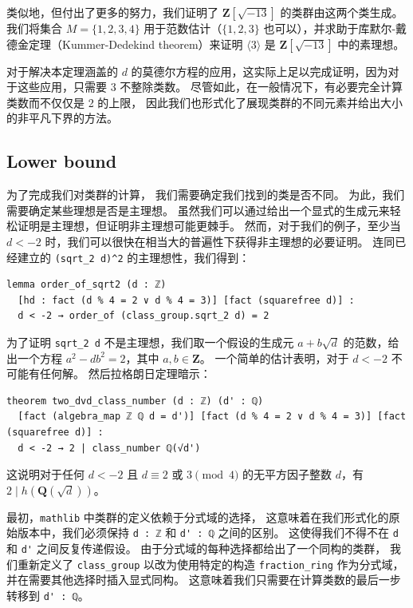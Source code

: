 \documentclass[sigplan,10pt,nonacm,
screen]{acmart} \settopmatter{printfolios=true,printccs=false,printacmref=false}
\newcommand{\mathlib}{\lstinline{mathlib}\xspace}
\newcommand{\QQ}{\mathbf{Q}}
\newcommand{\ZZ}{\mathbf{Z}}
\begin{document}
类似地，但付出了更多的努力，我们证明了 $\ZZ[\sqrt{-13}]$ 的类群由这两个类生成。我们将集合 $M=\{1,2,3,4\}$ 用于范数估计（$\{1,2,3\}$ 也可以），并求助于库默尔-戴德金定理（Kummer-Dedekind theorem）来证明 $\langle 3 \rangle$ 是 $\ZZ[\sqrt{-13}]$ 中的素理想。

对于解决本定理涵盖的 $d$ 的莫德尔方程的应用，这实际上足以完成证明，因为对于这些应用，只需要 $3$ 不整除类数。
尽管如此，在一般情况下，有必要完全计算类数而不仅仅是 2 的上限，
因此我们也形式化了展现类群的不同元素并给出大小的非平凡下界的方法。

\subsection{Lower bound}

为了完成我们对类群的计算，
我们需要确定我们找到的类是否不同。
为此，我们需要确定某些理想是否是主理想。
虽然我们可以通过给出一个显式的生成元来轻松证明是主理想，但证明非主理想可能更棘手。
然而，对于我们的例子，至少当 $d < -2$ 时，我们可以很快在相当大的普遍性下获得非主理想的必要证明。
连同已经建立的 \lstinline{(sqrt_2 d)^2} 的主理想性，我们得到：

\begin{lstlisting}
lemma order_of_sqrt2 (d : ℤ)
  [hd : fact (d % 4 = 2 ∨ d % 4 = 3)] [fact (squarefree d)] :
  d < -2 → order_of (class_group.sqrt_2 d) = 2
\end{lstlisting}

为了证明 \lstinline{sqrt_2 d} 不是主理想，我们取一个假设的生成元 $a + b\sqrt{d}$ 的范数，给出一个方程 $a^2 - d b^2 = 2$，其中 $a, b \in \ZZ$。
一个简单的估计表明，对于 $d < -2$ 不可能有任何解。
然后拉格朗日定理暗示：
\begin{lstlisting}
theorem two_dvd_class_number (d : ℤ) (d' : ℚ)
  [fact (algebra_map ℤ ℚ d = d')] [fact (d % 4 = 2 ∨ d % 4 = 3)] [fact (squarefree d)] :
  d < -2 → 2 | class_number ℚ(√d')
\end{lstlisting}
这说明对于任何 $d < -2$ 且 $d \equiv 2 \text{ 或 } 3 \pmod{4}$ 的无平方因子整数 $d$，有 $2 \mid h(\QQ(\sqrt{d}))$。

最初，\mathlib 中类群的定义依赖于分式域的选择，
这意味着在我们形式化的原始版本中，我们必须保持 \lstinline{d : ℤ} 和 \lstinline{d' : ℚ} 之间的区别。
这使得我们不得不在 \lstinline{d} 和 \lstinline{d'} 之间反复传递假设。
由于分式域的每种选择都给出了一个同构的类群，
我们重新定义了 \lstinline{class_group} 以改为使用特定的构造 \lstinline{fraction_ring} 作为分式域，
并在需要其他选择时插入显式同构。
这意味着我们只需要在计算类数的最后一步转移到 \lstinline{d' : ℚ}。
\end{document}
